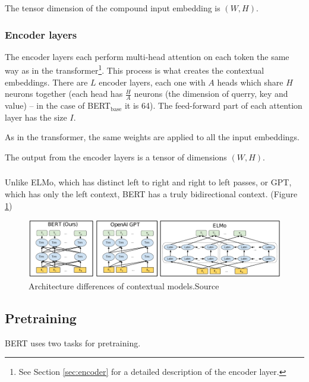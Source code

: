\documentclass[
  printed, %
  color,   %
  table,   %
  oneside, %
  lof,     %
  lot,     %
]{fithesis3}
\begin{document}
The tensor dimension of the compound input embedding is $(W, H)$.

\subsubsection{Encoder layers}
The encoder layers each perform multi-head attention on each token the same way as in the transformer\footnote{See Section \ref{sec:encoder} for a detailed description of the encoder layer.}. This process is what creates the contextual embeddings. There are $L$ encoder layers, each one with $A$ heads which share $H$ neurons together (each head has $\frac{H}{A}$ neurons (the dimension of querry, key and value) -- in the case of BERT$_\text{base}$ it is 64). The feed-forward part of each attention layer has the size $I$. 

As in the transformer, the same weights are applied to all the input embeddings.

The output from the encoder layers is a tensor of dimensions  $(W, H)$.

\subsubsection{}

Unlike ELMo, which has distinct left to right and right to left passes, or GPT\parencite{gpt}, which has only the left context, BERT has a truly bidirectional context. (Figure \ref{fig:contextual_models})

\begin{figure}[h]
  \begin{center}
    \includegraphics[width=\linewidth]{img/contextual_models.pdf}
  \end{center}
  \vspace{-0.5cm}
  \caption[Architecture differences of contextual models]{\centering Architecture differences of contextual models.\newline{}Source \parencite[page 13]{bert}}
  \label{fig:contextual_models}
\end{figure}



\subsection{Pretraining}
\label{sec:bert_pretraining}
BERT uses two tasks for pretraining.
\end{document}
